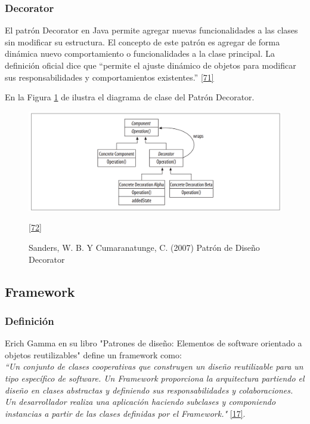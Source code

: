 \subsubsection{Decorator}
El patrón Decorator en Java permite agregar nuevas funcionalidades a las clases sin modificar su estructura.
El concepto de este patrón es agregar de forma dinámica nuevo comportamiento o funcionalidades a la clase principal.
La definición oficial dice que “permite el ajuste dinámico de objetos para modificar sus responsabilidades y comportamientos existentes.”  \hyperlink{b71}{[71]}

En la Figura \ref{fig:decorator} de ilustra el diagrama de clase del Patrón Decorator.

 \begin{figure}[H]
 	\begin{center}
 		\includegraphics[width=1\textwidth]{images/marcoteorico/patrones/decorator}
 		\caption{ Sanders, W. B. Y Cumaranatunge, C. (2007) Patrón de Diseño Decorator}
 		\hyperlink{b72}{[72]} 
 		\label{fig:decorator}
 	\end{center}
 \end{figure}


\subsection{Framework}

\subsubsection{Definición}

Erich Gamma en su libro "Patrones de diseño: Elementos de software orientado a objetos reutilizables" define un framework como:\\ 

\textit {``Un conjunto de clases cooperativas que construyen un diseño reutilizable para un tipo específico de software. Un Framework proporciona la arquitectura partiendo el diseño en clases abstractas y definiendo sus responsabilidades y colaboraciones. Un desarrollador realiza una aplicación haciendo subclases y componiendo instancias a partir de las clases definidas por el Framework."} \hyperlink{b17}{[17]}. \\

